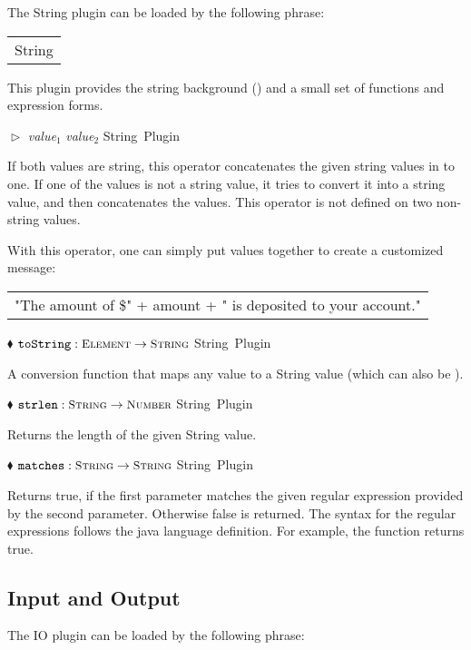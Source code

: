 \documentclass{article}
\newcommand{\codebf}[1]{\xspace{\bf \code{#1}}\xspace}
\newcommand{\keyword}[1]{\codebf{#1}}
\newcommand{\funcform}[2]{\pform{$\blacklozenge$}{#1}{#2}}
\newcommand{\opform}[2]{\pform{$\vartriangleright$}{#1}{#2}}
\newcommand{\pform}[3]{\vspace*{4mm} \noindent #1 #2 \vspace{1mm}\textcolor[gray]{0.7}{\dotfill}\mbox{{\sffamily \footnotesize #3}}}
\newcommand{\bExample}{\begin{small} \vspace{0.3cm} \begin{tabular}{|l} \begin{minipage}{0.85\textwidth} \vspace{0.2cm} \ttfamily}
\newcommand{\eExample}{\vspace{0.2cm} \end{minipage} \end{tabular} \vspace{0.3cm} \end{small}}
\newcommand{\valuei}[1]{{\em value}$_{#1}$\xspace}
\begin{document}
The String plugin can be loaded by the following \keyword{use} phrase:

\bExample
	\codebf{use} String
\eExample

\noindent This plugin provides the string background () and
a small set of functions and expression forms. 

\opform{\valuei{1} \code{+} \valuei{2}}{String Plugin}

If both values are string, this operator concatenates the given string values in to one. If one of the
values is not a string value, it tries to convert it into a string value, and then concatenates the values.
This operator is not defined on two non-string values.

With this operator, one can simply put values together to create a customized message:

\bExample
	\codebf{print} "The amount of \$" + amount + " is deposited to your account."
\eExample

\funcform{$ \mbox{{\ttfamily toString}} : \mbox{\scshape\small Element} \rightarrow \mbox{\scshape\small String}$}{String Plugin}

A conversion function that maps any value to a String value (which can also be \keyword{undef}).

\funcform{$ \mbox{{\ttfamily strlen}} : \mbox{\scshape\small String} \rightarrow \mbox{\scshape\small Number}$}{String Plugin}

Returns the length of the given String value.

\funcform{$ \mbox{{\ttfamily matches}} : \mbox{\scshape\small String} \rightarrow \mbox{\scshape\small String}$}{String Plugin}

Returns true, if the first parameter matches the given regular expression provided by the second parameter. Otherwise false is returned. The syntax for the regular expressions follows the java language definition. For example, the function  returns true.

\subsection{Input and Output}
\label{io}

The IO plugin can be loaded by the following \keyword{use} phrase:
\end{document}
